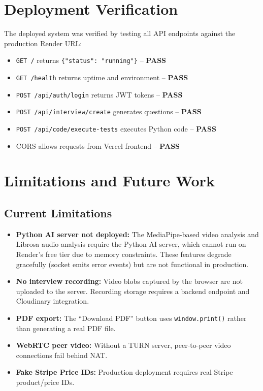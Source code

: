 \section{Deployment Verification}

The deployed system was verified by testing all API endpoints against the production Render URL:

\begin{itemize}
    \item \texttt{GET /} returns \texttt{\{"status": "running"\}} -- \textbf{PASS}
    \item \texttt{GET /health} returns uptime and environment -- \textbf{PASS}
    \item \texttt{POST /api/auth/login} returns JWT tokens -- \textbf{PASS}
    \item \texttt{POST /api/interview/create} generates questions -- \textbf{PASS}
    \item \texttt{POST /api/code/execute-tests} executes Python code -- \textbf{PASS}
    \item CORS allows requests from Vercel frontend -- \textbf{PASS}
\end{itemize}

\section{Limitations and Future Work}

\subsection{Current Limitations}

\begin{itemize}
    \item \textbf{Python AI server not deployed:} The MediaPipe-based video analysis and Librosa audio analysis require the Python AI server, which cannot run on Render's free tier due to memory constraints. These features degrade gracefully (socket emits error events) but are not functional in production.
    \item \textbf{No interview recording:} Video blobs captured by the browser are not uploaded to the server. Recording storage requires a backend endpoint and Cloudinary integration.
    \item \textbf{PDF export:} The ``Download PDF'' button uses \texttt{window.print()} rather than generating a real PDF file.
    \item \textbf{WebRTC peer video:} Without a TURN server, peer-to-peer video connections fail behind NAT.
    \item \textbf{Fake Stripe Price IDs:} Production deployment requires real Stripe product/price IDs.
\end{itemize}

